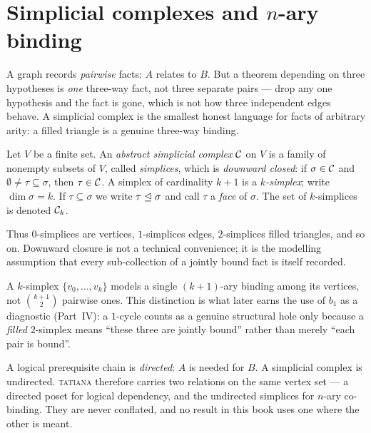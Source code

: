 \section{Simplicial complexes and $n$-ary binding}

\begin{intu}\Intu
A graph records \emph{pairwise} facts: $A$ relates to $B$. But a theorem
depending on three hypotheses is \emph{one} three-way fact, not three
separate pairs --- drop any one hypothesis and the fact is gone, which is
not how three independent edges behave. A simplicial complex is the
smallest honest language for facts of arbitrary arity: a filled triangle
is a genuine three-way binding.
\end{intu}

\begin{definition}\label{def:asc}
Let $V$ be a finite set. An \emph{abstract simplicial complex} $\mathcal{C}$ on
$V$ is a family of nonempty subsets of $V$, called \emph{simplices},
which is \emph{downward closed}: if $\sigma\in\mathcal{C}$ and
$\emptyset\neq\tau\subseteq\sigma$, then $\tau\in\mathcal{C}$. A simplex of
cardinality $k+1$ is a \emph{$k$-simplex}; write $\dim\sigma=k$. If
$\tau\subseteq\sigma$ we write $\tau\trianglelefteq\sigma$ and call $\tau$ a
\emph{face} of $\sigma$. The set of $k$-simplices is denoted $\mathcal{C}_k$.
\end{definition}

Thus $0$-simplices are vertices, $1$-simplices edges, $2$-simplices
filled triangles, and so on. Downward closure is not a technical
convenience; it is the modelling assumption that every sub-collection of
a jointly bound fact is itself recorded.

\begin{remark}\label{rem:nary}
A $k$-simplex $\{v_0,\dots,v_k\}$ models a single $(k{+}1)$-ary binding
among its vertices, not $\binom{k+1}{2}$ pairwise ones. This distinction
is what later earns the use of $b_1$ as a diagnostic
(Part~IV): a $1$-cycle counts as a genuine structural hole
only because a \emph{filled} $2$-simplex means ``these three are jointly
bound'' rather than merely ``each pair is bound''.
\end{remark}

\begin{remark}\label{rem:twostructures}
A logical prerequisite chain is \emph{directed}: $A$ is needed for $B$.
A simplicial complex is undirected. \textsc{tatiana} therefore carries
two relations on the same vertex set --- a directed poset for logical
dependency, and the undirected simplices for $n$-ary co-binding. They are
never conflated, and no result in this book uses one where the other is
meant.
\end{remark}

